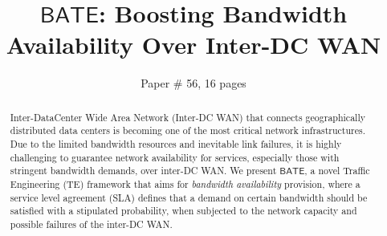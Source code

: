 \documentclass[sigconf]{acmart}
\begin{document}
\title{\bf $\mathsf{BATE}$: Boosting Bandwidth Availability Over Inter-DC WAN}


\author{Paper \# 56, 16 pages}


\begin{abstract}
Inter-DataCenter Wide Area Network (Inter-DC WAN) that connects geographically distributed data centers is becoming one of the most critical network infrastructures.
Due to the limited bandwidth resources and inevitable link failures, it is highly challenging to guarantee network availability for services, especially those with stringent bandwidth demands, over inter-DC WAN.
We present $\mathsf{BATE}$,
a novel Traffic Engineering (TE)  framework that 
aims for \textit{bandwidth availability} provision, where a service level agreement (SLA) defines that a demand on certain bandwidth should be satisfied with a stipulated probability,  when subjected to the network capacity and possible failures of the inter-DC WAN.

\end{abstract}
\end{document}
